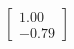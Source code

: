 \documentclass[preview]{standalone}
\begin{document}
\begin{align*}
\begin{bmatrix} 1.00 \\ -0.79 \end{bmatrix}
\end{align*}
\end{document}
